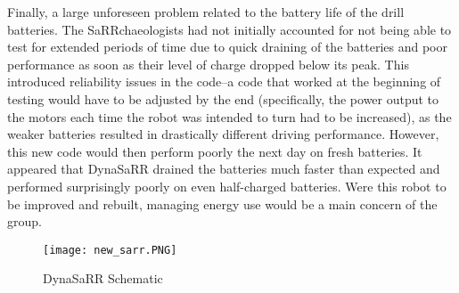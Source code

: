Finally, a large unforeseen problem related to the battery life of the drill batteries. The SaRRchaeologists had not initially accounted for not being able to test for extended periods of time due to quick draining of the batteries and poor performance as soon as their level of charge dropped below its peak. This introduced reliability issues in the code--a code that worked at the beginning of testing would have to be adjusted by the end (specifically, the power output to the motors each time the robot was intended to turn had to be increased), as the weaker batteries resulted in drastically different driving performance. However, this new code would then perform poorly the next day on fresh batteries. It appeared that DynaSaRR drained the batteries much faster than expected and performed surprisingly poorly on even half-charged batteries. Were this robot to be improved and rebuilt, managing energy use would be a main concern of the group.

\begin{figure}[ht]
    \centering
    \texttt{[image: new\_sarr.PNG]}
    \caption{DynaSaRR Schematic}
\end{figure}
